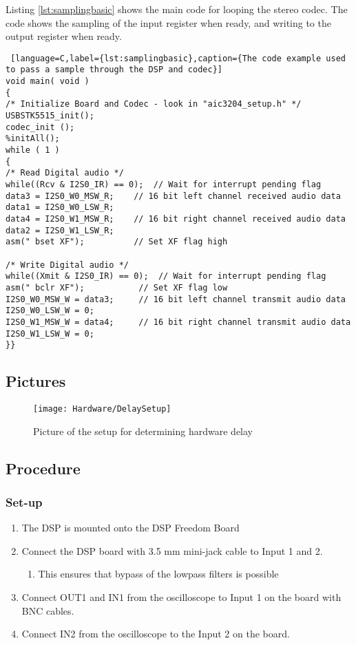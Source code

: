 Listing \ref{lst:samplingbasic} shows the main code for looping the stereo codec. The code shows the sampling of the input register when ready, and writing to the output register when ready. 

\begin{lstlisting} [language=C,label={lst:samplingbasic},caption={The code example used to pass a sample through the DSP and codec}]
void main( void )
{
/* Initialize Board and Codec - look in "aic3204_setup.h" */
USBSTK5515_init();
codec_init ();
%initAll();
while ( 1 )
{
/* Read Digital audio */
while((Rcv & I2S0_IR) == 0);  // Wait for interrupt pending flag
data3 = I2S0_W0_MSW_R;    // 16 bit left channel received audio data
data1 = I2S0_W0_LSW_R;
data4 = I2S0_W1_MSW_R;    // 16 bit right channel received audio data
data2 = I2S0_W1_LSW_R;
asm(" bset XF");	  	  // Set XF flag high

/* Write Digital audio */
while((Xmit & I2S0_IR) == 0);  // Wait for interrupt pending flag
asm(" bclr XF");		   // Set XF flag low
I2S0_W0_MSW_W = data3;     // 16 bit left channel transmit audio data
I2S0_W0_LSW_W = 0;
I2S0_W1_MSW_W = data4;     // 16 bit right channel transmit audio data
I2S0_W1_LSW_W = 0;
}}
\end{lstlisting}


\subsection{Pictures}

\begin{figure}[H]
	\centering
\texttt{[image: Hardware/DelaySetup]}
	\caption{Picture of the setup for determining hardware delay}
	\label{fig:DelayExperimentSetup}
\end{figure}

\subsection{Procedure}
\subsubsection{Set-up}
\begin{enumerate}
	\item The DSP is mounted onto the DSP Freedom Board
	\item  Connect the DSP board with 3.5 mm mini-jack cable to Input 1 and 2.
	\begin{enumerate}
		\item This ensures that bypass of the lowpass filters is possible
	\end{enumerate}
	\item Connect OUT1 and IN1 from the oscilloscope to Input 1 on the board with BNC cables.
	\item Connect IN2 from the oscilloscope to the Input 2 on the board.
\end{enumerate}

